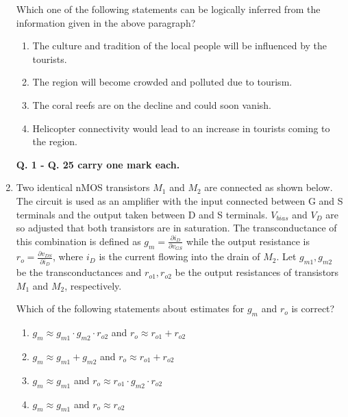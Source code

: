 \documentclass{article}
\begin{document}
\begin{enumerate}
Which one of the following statements can be logically inferred from the information given in the above paragraph?
\begin{enumerate}
\item The culture and tradition of the local people will be influenced by the tourists.
\item The region will become crowded and polluted due to tourism.
\item The coral reefs are on the decline and could soon vanish.
\item Helicopter connectivity would lead to an increase in tourists coming to the region.
\end{enumerate}

\textbf{Q. 1 - Q. 25 carry one mark each.}

\item Two identical nMOS transistors $M_1$ and $M_2$ are connected as shown below. The circuit is used as an amplifier with the input connected between G and S terminals and the output taken between D and S terminals. $V_{bias}$ and $V_D$ are so adjusted that both transistors are in saturation. The transconductance of this combination is defined as $g_m = \frac{\partial i_D}{\partial v_{GS}}$ while the output resistance is $r_o = \frac{\partial v_{DS}}{\partial i_D}$, where $i_D$ is the current flowing into the drain of $M_2$. Let $g_{m1}, g_{m2}$ be the transconductances and $r_{o1}, r_{o2}$ be the output resistances of transistors $M_1$ and $M_2$, respectively.
\begin{figure}[H]
    \centering
    
    \caption{}
    \label{fig:q11}
\end{figure}
Which of the following statements about estimates for $g_m$ and $r_o$ is correct?
\begin{multicols}{2}
\begin{enumerate}
\item $g_m \approx g_{m1} \cdot g_{m2} \cdot r_{o2}$ and $r_o \approx r_{o1} + r_{o2}$
\item $g_m \approx g_{m1} + g_{m2}$ and $r_o \approx r_{o1} + r_{o2}$
\item $g_m \approx g_{m1}$ and $r_o \approx r_{o1} \cdot g_{m2} \cdot r_{o2}$
\item $g_m \approx g_{m1}$ and $r_o \approx r_{o2}$
\end{enumerate}
\end{multicols}


\end{enumerate}
\end{document}
